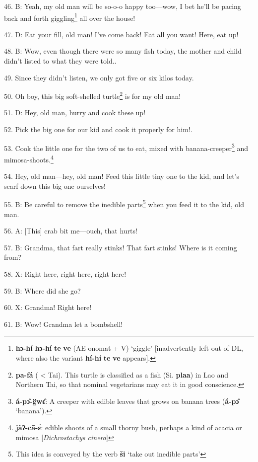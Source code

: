 46. B: Yeah, my old man will be so-o-o happy too---wow, I bet he'll be pacing back
and forth giggling\footnote{\textbf{hɔ-hí} \textbf{hɔ-hí} \textbf{te} \textbf{ve} (AE onomat + V) `giggle' [inadvertently left out of DL, where also the variant \textbf{hí-hí} \textbf{te} \textbf{ve} appears].} all over the house! 

47. D:  Eat your fill, old man! I've come
back! Eat all you want! Here, eat up!

48. B: Wow, even though there were so many fish today, the mother and child didn't
listed to what they were told..

49. Since they didn't listen, we only got five or six kilos today.

50. Oh boy, this big soft-shelled turtle\footnote{\textbf{pa-fá} ( < Tai). This turtle is classified as a fish (Si. \textbf{plaa}) in Lao and Northern Tai, so that nominal vegetarians may eat it in good conscience.} is for my old man!

51. D: Hey, old man, hurry and cook these up!

52. Pick the big one for our kid and cook it properly for him!.

53. Cook the little one for the two of us to eat, mixed with banana-creeper\footnote{\textbf{á-pɔ̂-g̈wɛ̂}: A creeper with edible leaves that grows on banana trees (\textbf{á-pɔ̂} `banana').}
and mimosa-shoots.\footnote{\textbf{jàʔ-cā-ɛ̀}: edible shoots of a small thorny bush, perhaps a kind of acacia or mimosa [\textit{Dichrostachys cinera}]}

54.  Hey, old man---hey, old man!
Feed this little tiny one to the kid, and let's scarf down this big one ourselves!

55. B: Be careful to remove the inedible parts\footnote{This idea is conveyed by the verb \textbf{ši} `take out inedible parts'} when you feed it to the kid,
old man.

56. A: [This] crab bit me---ouch, that hurts!

57. B: Grandma, that fart really stinks! That fart stinks! Where is it coming from?

58. X: Right here, right here, right here!

59. B: Where did she go?

60. X: Grandma! Right here!

61. B: Wow! Grandma let a bombshell!

